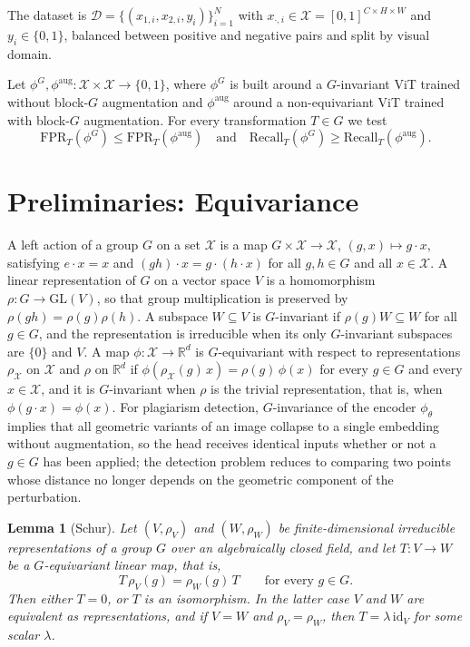 \documentclass{article}
\newtheorem{lemma}{Lemma}
\begin{document}
The dataset is $\mathcal{D} = \{(x_{1,i}, x_{2,i}, y_i)\}_{i=1}^{N}$ with $x_{\cdot,i} \in \mathcal{X} = [0,1]^{C\times H\times W}$ and $y_i \in \{0,1\}$, balanced between positive and negative pairs and split by visual domain.

Let $\phi^G,\phi^{\mathrm{aug}}\colon\mathcal{X}\times\mathcal{X}\to\{0,1\}$, where $\phi^G$ is built around a $G$-invariant ViT trained without block-$G$ augmentation and $\phi^{\mathrm{aug}}$ around a non-equivariant ViT trained with block-$G$ augmentation. For every transformation $T\in G$ we test
\begin{equation}\label{eq:hypothesis}
  \mathrm{FPR}_T(\phi^G)\le \mathrm{FPR}_T(\phi^{\mathrm{aug}})
  \quad\text{and}\quad
  \mathrm{Recall}_T(\phi^G)\ge \mathrm{Recall}_T(\phi^{\mathrm{aug}}).
\end{equation}

\section{Preliminaries: Equivariance}\label{sec:prelim}

A left action of a group $G$ on a set $\mathcal{X}$ is a map $G\times\mathcal{X}\to\mathcal{X}$, $(g, x)\mapsto g\cdot x$, satisfying $e\cdot x = x$ and $(gh)\cdot x = g\cdot(h\cdot x)$ for all $g, h\in G$ and all $x\in\mathcal{X}$. A linear representation of $G$ on a vector space $V$ is a homomorphism $\rho\colon G\to\mathrm{GL}(V)$, so that group multiplication is preserved by $\rho(gh) = \rho(g)\rho(h)$. A subspace $W\subseteq V$ is $G$-invariant if $\rho(g)W\subseteq W$ for all $g\in G$, and the representation is irreducible when its only $G$-invariant subspaces are $\{0\}$ and $V$. A map $\phi\colon\mathcal{X}\to\mathbb{R}^d$ is $G$-equivariant with respect to representations $\rho_{\mathcal{X}}$ on $\mathcal{X}$ and $\rho$ on $\mathbb{R}^d$ if $\phi(\rho_{\mathcal{X}}(g)\,x) = \rho(g)\,\phi(x)$ for every $g\in G$ and every $x\in\mathcal{X}$, and it is $G$-invariant when $\rho$ is the trivial representation, that is, when $\phi(g\cdot x) = \phi(x)$. For plagiarism detection, $G$-invariance of the encoder $\phi_\theta$ implies that all geometric variants of an image collapse to a single embedding without augmentation, so the head receives identical inputs whether or not a $g\in G$ has been applied; the detection problem reduces to comparing two points whose distance no longer depends on the geometric component of the perturbation.

\begin{lemma}[Schur]\label{lem:schur}
Let $(V, \rho_V)$ and $(W, \rho_W)$ be finite-dimensional irreducible representations of a group $G$ over an algebraically closed field, and let $T\colon V\to W$ be a $G$-equivariant linear map, that is,
\begin{equation}\label{eq:schur-intertwine}
  T\,\rho_V(g) = \rho_W(g)\,T \qquad\text{for every } g\in G.
\end{equation}
Then either $T = 0$, or $T$ is an isomorphism. In the latter case $V$ and $W$ are equivalent as representations, and if $V = W$ and $\rho_V = \rho_W$, then $T = \lambda\,\mathrm{id}_V$ for some scalar $\lambda$.
\end{lemma}
\end{document}
